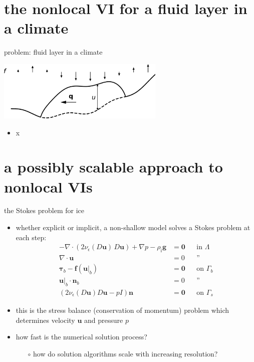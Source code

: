 \documentclass[svgnames,
               hyperref={colorlinks,citecolor=DeepPink4,linkcolor=FireBrick,urlcolor=Maroon},
               usepdftitle=false]  %
               {beamer}
\newcommand{\eps}{\epsilon}
\newcommand{\bbf}{\mathbf{f}}
\newcommand{\bn}{\mathbf{n}}
\newcommand{\bu}{\mathbf{u}}
\newcommand{\btau}{\bm{\tau}}
\newcommand{\bzero}{\bm{0}}
\newcommand{\rhoi}{\rho_{\text{i}}}
\begin{document}
\section{the nonlocal VI for a fluid layer in a climate}

\begin{frame}{problem: fluid layer in a climate}

\begin{center}
\includegraphics[width=0.6\textwidth]{images/fluid-in-climate.png}
\end{center}

\begin{itemize}
\item x
\end{itemize}
\end{frame}


\section{a possibly scalable approach to nonlocal VIs}


\begin{frame}{the Stokes problem for ice}

\begin{itemize}
\item whether explicit or implicit, a non-shallow model solves a Stokes problem at each step:
\begin{align*}
- \nabla \cdot \left(2 \nu_\eps(D\bu)\, D\bu\right) + \nabla p - \rhoi \mathbf{g} &= \bzero && \text{in $\Lambda$} \\
\nabla \cdot \bu &= 0 && \text{''} \\
\btau_b - \bbf(\bu|_b) &= \bzero && \text{on $\Gamma_b$} \\
\bu|_b \cdot \bn_b &= 0 && \text{''} \\
\left(2 \nu_\eps(D\bu) D\bu - pI\right) \bn &= \bzero && \text{on $\Gamma_s$}
\end{align*}
\item this is the \alert{stress balance} (conservation of momentum) problem which determines velocity $\bu$ and pressure $p$
\item how fast is the numerical solution process?
    \begin{itemize}
    \item[$\circ$] how do solution algorithms \alert{scale with increasing resolution}?
    \end{itemize}
\end{itemize}
\end{frame}
\end{document}
